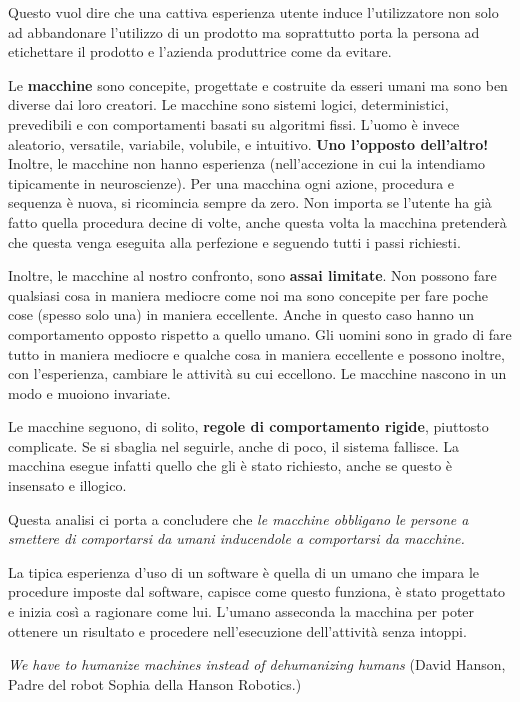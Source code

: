 Questo vuol dire che una cattiva esperienza utente induce l'utilizzatore non solo ad abbandonare l'utilizzo di un prodotto ma soprattutto
porta la persona ad etichettare il prodotto e l'azienda produttrice come da evitare. 

Le \textbf{macchine} sono concepite, progettate e costruite da esseri umani ma sono ben diverse dai loro creatori. Le macchine sono
sistemi logici, deterministici, prevedibili e con comportamenti basati su algoritmi fissi. L'uomo è invece aleatorio, versatile,
variabile, volubile, e intuitivo. \textbf{Uno l'opposto dell'altro!}
Inoltre, le macchine non hanno esperienza (nell'accezione in cui la intendiamo tipicamente in neuroscienze). Per una macchina ogni
azione, procedura e sequenza è nuova, si ricomincia sempre da zero. Non importa se l'utente ha già fatto quella procedura decine di
volte, anche questa volta la macchina pretenderà che questa venga eseguita alla perfezione e seguendo tutti i passi richiesti.

Inoltre, le macchine al nostro confronto, sono \textbf{assai limitate}. Non possono fare qualsiasi cosa in maniera mediocre come noi
ma sono concepite per fare poche cose (spesso solo una) in maniera eccellente. Anche in questo caso hanno un comportamento opposto
rispetto a quello umano. Gli uomini sono in grado di fare tutto in maniera mediocre e qualche cosa in maniera eccellente e possono
inoltre, con l'esperienza, cambiare le attività su cui eccellono. Le macchine nascono in un modo e muoiono invariate.

Le macchine seguono, di solito, \textbf{regole di comportamento rigide}, piuttosto complicate. Se si sbaglia nel seguirle, anche di
poco, il sistema fallisce. La macchina esegue infatti quello che gli è stato richiesto, anche se questo è insensato e illogico. 

Questa analisi ci porta a concludere che \textit{le macchine obbligano le persone a smettere di comportarsi da umani inducendole a
comportarsi da macchine.}

La tipica esperienza d'uso di un software è quella di un umano che impara le procedure imposte dal software, capisce come questo
funziona, è stato progettato e inizia così a ragionare come lui. L'umano asseconda la macchina per poter ottenere un risultato e
procedere nell'esecuzione dell'attività senza intoppi.

\begin{flushleft}
	\textit{We have to humanize machines instead of dehumanizing humans} (David Hanson, Padre del robot Sophia della Hanson Robotics.)
\end{flushleft}

